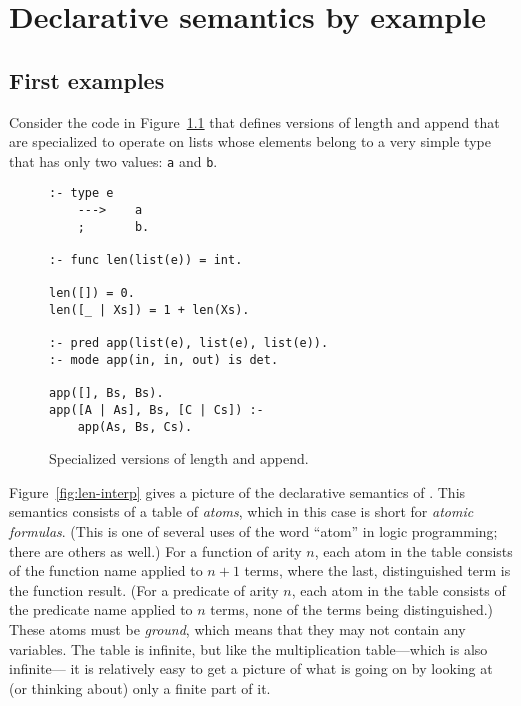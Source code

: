 \chapter{Declarative semantics by example}
\label{sec:by-example}

\section{First examples}
\label{sec:first-examples}

Consider the code in Figure~\ref{fig:len-app}
that defines versions of length and append
that are specialized to operate on lists
whose elements belong to a very simple type
that has only two values: \verb#a# and \verb#b#.

\begin{figure}[htb]
\begin{verbatim}
:- type e
    --->    a
    ;       b.

:- func len(list(e)) = int.

len([]) = 0.
len([_ | Xs]) = 1 + len(Xs).

:- pred app(list(e), list(e), list(e)).
:- mode app(in, in, out) is det.

app([], Bs, Bs).
app([A | As], Bs, [C | Cs]) :-
    app(As, Bs, Cs).
\end{verbatim}
\caption{Specialized versions of length and append.\label{fig:len-app}}
\end{figure}

Figure~\ref{fig:len-interp} gives a picture
of the declarative semantics of .
This semantics consists of a table of \emph{atoms\label{gi:atom}},
which in this case is short for \emph{atomic formulas}.
(This is one of several uses of the word ``atom'' in logic programming;
there are others as well.)
For a function of arity $n$, each atom in the table
consists of the function name applied to $n + 1$ terms,
where the last, distinguished term is the function result.
(For a predicate of arity $n$, each atom in the table
consists of the predicate name applied to $n$ terms,
none of the terms being distinguished.)
These atoms must be \emph{ground},
which means that they may not contain any variables.
The table is infinite,
but like the multiplication table---which is also infinite---%
it is relatively easy to get a picture of what is going on
by looking at (or thinking about) only a finite part of it.

